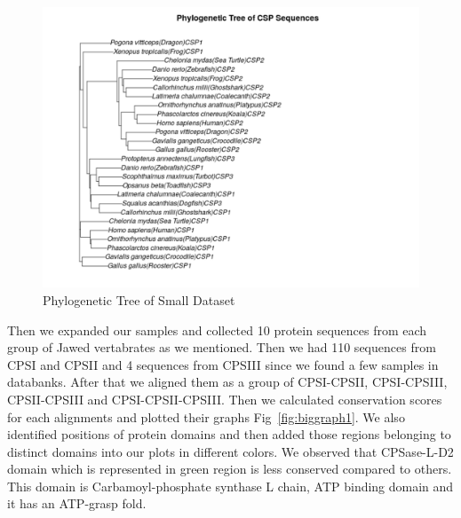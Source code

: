 \documentclass[a4paper]{article}
\begin{document}
\begin{figure}[H]
\begin{center}
\includegraphics[width=\textwidth]{tree.png}
\end{center}
\caption{Phylogenetic Tree of Small Dataset}
\label{fig:tree}
\end{figure}
Then we expanded our samples and collected 10 protein sequences \cite{CPSI}\cite{CPSII}\cite{blast}\cite{interpro7-client}\cite{pfam} from each group of Jawed vertabrates as we mentioned. Then we had 110 sequences from CPSI and CPSII and 4 sequences from CPSIII since we found a few samples in databanks. After that we aligned them as a group of CPSI-CPSII, CPSI-CPSIII, CPSII-CPSIII and CPSI-CPSII-CPSIII. Then we calculated conservation scores for each alignments and plotted their graphs Fig~\ref{fig:biggraph1}. We also identified positions of protein domains and then added those regions belonging to distinct domains into our plots in different colors.\cite{conserved} We observed that CPSase-L-D2 domain which is represented in green region is less conserved compared to others. This domain is Carbamoyl-phosphate synthase L chain, ATP binding domain and it has an ATP-grasp fold.  
\end{document}
